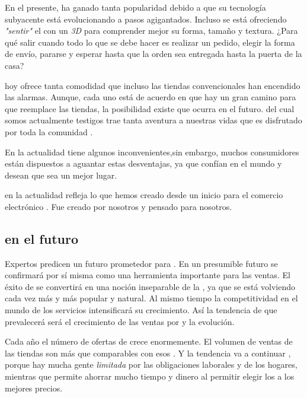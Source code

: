 En el presente, \ecommerceCOM ha ganado tanta popularidad debido a que su tecnología subyacente está evolucionando a pasos agigantados. Incluso se está ofreciendo \textit{"sentir"} el \itemCOM con un \mousePC \textit{3D} para comprender mejor su forma, tamaño y textura. ¿Para qué salir cuando todo lo que se debe hacer es realizar un pedido, elegir la forma de envío, pararse y esperar hasta que la orden sea entregada hasta la puerta de la casa?

\ecommerceCOM hoy ofrece tanta comodidad que incluso las tiendas convencionales han encendido las alarmas. Aunque, cada uno está de acuerdo en que hay un gran camino para que \ecommerceCOM reemplace las tiendas, la posibilidad existe que ocurra en el futuro. \ecommerceCOM del cual somos actualmente testigos trae tanta aventura a nuestras vidas que es disfrutado por toda la comunidad \online.

En la actualidad \ecommerceCOM tiene algunos inconvenientes,sin embargo, muchos consumidores están dispuestos a aguantar estas desventajas, ya que confían en el mundo \online y desean que sea un mejor lugar.

\ecommerceCOM en la actualidad refleja lo que hemos creado desde un inicio para el comercio electrónico \online. Fue creado por nosotros y pensado para nosotros.

\subsection{\ecommerceCOM en el futuro}

Expertos predicen un futuro prometedor para \ecommerceCOM. En un presumible futuro \ecommerceCOM se confirmará por sí misma como una herramienta importante para las ventas. El éxito de \ecommerceCOM se convertirá en una noción inseparable de la \webINT, ya que \eshopping se está volviendo cada vez más y más popular y natural. Al mismo tiempo la competitividad en el mundo de los servicios \ecommerceCOM intensificará su crecimiento. Así la tendencia de que prevalecerá \ecommerceCOM será el crecimiento de las ventas por \internetINT y la evolución.

Cada año el número de ofertas de \ecommerceCOM crece enormemente. El volumen de ventas de las tiendas \online  son más que comparables con esos \brickandmortar. Y la tendencia va a continuar \cite{online_growth_ecommerce}, porque hay mucha gente \textit{limitada} por las obligaciones laborales y de los hogares, mientras que \internetINT permite ahorrar mucho tiempo y dinero al permitir  elegir los \itemsCOM a los mejores precios. 

